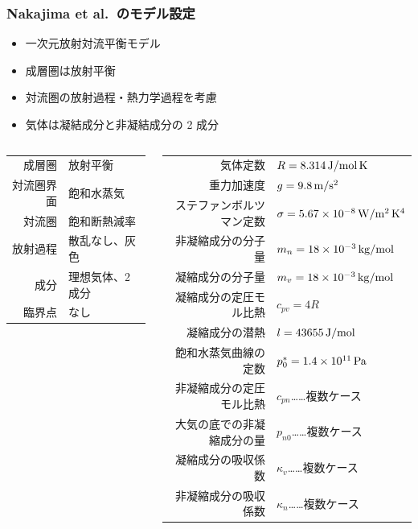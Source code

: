 \documentclass[aspectratio=149]{beamer}
\newcommand{\hme}[1]{\times10^{#1}}
\begin{document}
\begin{frame}
	\frametitle{Nakajima et al.\ のモデル設定}
	\begin{itemize}
		\item 一次元放射対流平衡モデル
		\item 成層圏は放射平衡
		\item 対流圏の放射過程・熱力学過程を考慮
		\item 気体は凝結成分と非凝結成分の 2 成分
	\end{itemize}
	\begin{columns}[T]
		\begin{column}{.35\textwidth}
			\small
				\centering
				\begin{tabular}{rl}
					\hline
					成層圏&放射平衡\\
					対流圏界面&飽和水蒸気\\
					対流圏&飽和断熱減率\\
					放射過程&散乱なし、灰色\\
					成分&理想気体、2 成分\\
					臨界点&なし\\
					\hline
				\end{tabular}
		\end{column}
		\begin{column}{.6\textwidth}
			\tiny
			\centering
				\begin{tabular}{rl}
					\hline
					気体定数&\(R=8.314\hmu{J/mol\,K}\)\\
					重力加速度&\(g=9.8\hmu{m/s^2}\)\\
					ステファンボルツマン定数&\(\sigma=5.67\hme{-8}\hmu{W/m^2\,K^4}\)\\
					\hline
					非凝縮成分の分子量&\(m_n=18\hme{-3}\hmu{kg/mol}\)\\
					凝縮成分の分子量&\(m_v=18\hme{-3}\hmu{kg/mol}\)\\
					凝縮成分の定圧モル比熱&\(c_{pv}=4R\)\\
					凝縮成分の潜熱&\(l=43655\hmu{J/mol}\)\\
					飽和水蒸気曲線の定数&\(p^*_0=1.4\hme{11}\hmu{Pa}\)\\
					非凝縮成分の定圧モル比熱&\(c_{pn}\)……複数ケース\\
					大気の底での非凝縮成分の量&\(p_{n0}\)……複数ケース\\
					凝縮成分の吸収係数&\(\kappa_{v}\)……複数ケース\\
					非凝縮成分の吸収係数&\(\kappa_{n}\)……複数ケース\\
					\hline
				\end{tabular}
		\end{column}
	\end{columns}
\end{frame}
\end{document}
